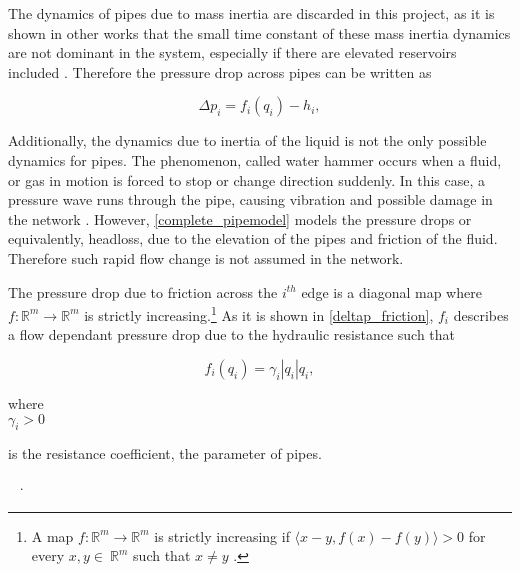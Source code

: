 The dynamics of pipes due to mass inertia are discarded in this project, as it is shown in other works that the small time constant of these mass inertia dynamics are not dominant in the system, especially if there are elevated reservoirs included \cite{8thsemester_project,kenneth_houe}. Therefore the pressure drop across pipes can be written as

\begin{equation}
\label{complete_pipemodel1}
  \Delta p_i = f_i(q_i) - h_i,
\end{equation}

Additionally, the dynamics due to inertia of the liquid is not the only possible dynamics for pipes. The phenomenon, called water hammer occurs when a fluid, or gas in motion is forced to stop or change direction suddenly. In this case, a pressure wave runs through the pipe, causing vibration and possible damage in the network \cite{2011water}. However, \eqref{complete_pipemodel} models the pressure drops or equivalently, headloss, due to the elevation of the pipes and friction of the fluid. Therefore such rapid flow change is not assumed in the network.

The pressure drop due to friction across the $i^{th}$ edge is a diagonal map where $f: \mathbb{R}^{m} \rightarrow \mathbb{R}^{m} $ is strictly increasing.\footnote{A map $f: \mathbb{R}^{m} \rightarrow \mathbb{R}^{m} $ is strictly increasing if $\langle x-y, f(x)-f(y) \rangle > 0$ for every $x,y \in \: \mathbb{R}^{m}$ such that $x \neq y$ \cite{oneinput_paper}.} As it is shown in \eqref{deltap_friction}, $f_i$ describes a flow dependant pressure drop due to the hydraulic resistance such that

\begin{equation}
  \label{deltap_friction}
  f_i(q_i) = \gamma_i |q_i|q_i,
\end{equation}

 \begin{minipage}[t]{0.20\textwidth}
where\\
\hspace*{8mm} $\gamma_i > 0$ 
\end{minipage}
\begin{minipage}[t]{0.68\textwidth}
\vspace*{2mm}
is the resistance coefficient, the parameter of pipes. 
\end{minipage}
\begin{minipage}[t]{0.10\textwidth}
\vspace*{2mm}
\textcolor{White}{te}$\unit{\cdot}$
\end{minipage}


